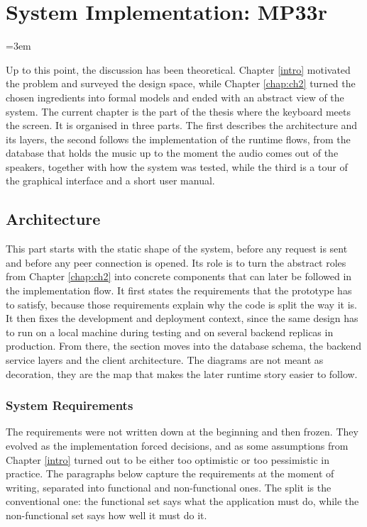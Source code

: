 \chapter{System Implementation: MP33r}
\label{chap:ch3}

\emergencystretch=3em

\indent \par Up to this point, the discussion has been theoretical. Chapter \ref{intro} motivated the problem and surveyed the design space, while Chapter \ref{chap:ch2} turned the chosen ingredients into formal models and ended with an abstract view of the system. The current chapter is the part of the thesis where the keyboard meets the screen. It is organised in three parts. The first describes the architecture and its layers, the second follows the implementation of the runtime flows, from the database that holds the music up to the moment the audio comes out of the speakers, together with how the system was tested, while the third is a tour of the graphical interface and a short user manual.

\section{Architecture}
\label{sec:architecture}

\indent \par This part starts with the static shape of the system, before any request is sent and before any peer connection is opened. Its role is to turn the abstract roles from Chapter \ref{chap:ch2} into concrete components that can later be followed in the implementation flow. It first states the requirements that the prototype has to satisfy, because those requirements explain why the code is split the way it is. It then fixes the development and deployment context, since the same design has to run on a local machine during testing and on several backend replicas in production. From there, the section moves into the database schema, the backend service layers and the client architecture. The diagrams are not meant as decoration, they are the map that makes the later runtime story easier to follow.

\subsection{System Requirements}
\label{sec:requirements}

\indent \par The requirements were not written down at the beginning and then frozen. They evolved as the implementation forced decisions, and as some assumptions from Chapter \ref{intro} turned out to be either too optimistic or too pessimistic in practice. The paragraphs below capture the requirements at the moment of writing, separated into functional and non-functional ones. The split is the conventional one: the functional set says what the application must do, while the non-functional set says how well it must do it.

